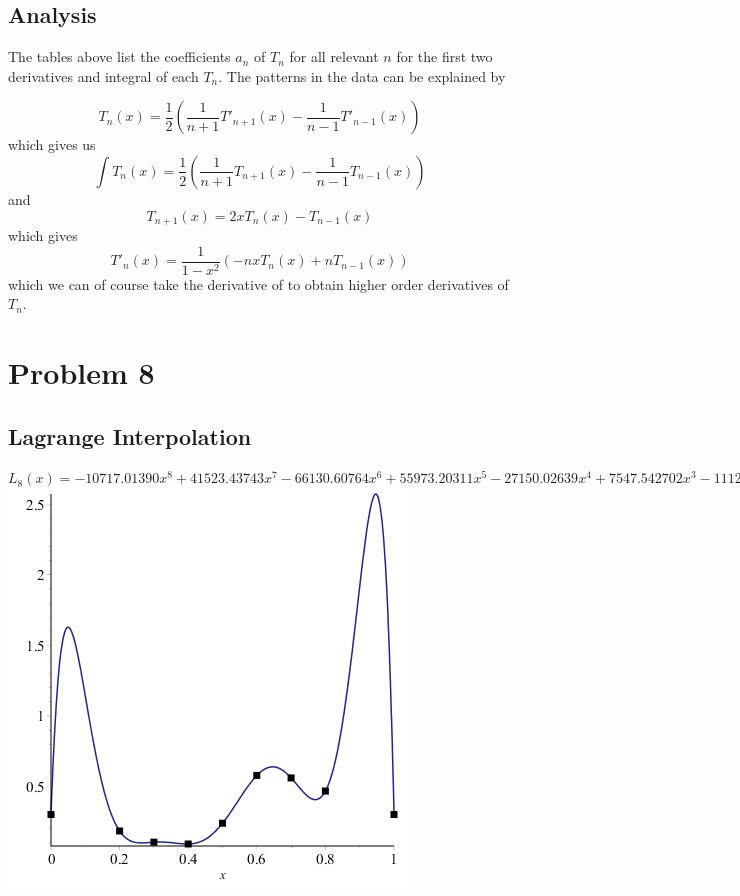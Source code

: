 \documentclass[11pt]{article} %
\begin{document}
\subsection*{Analysis}
The tables above list the coefficients $a_n$ of $T_n$ for all relevant $n$ for the first two derivatives and integral of each $T_n$. The patterns in the data can be explained by

$$T_n(x) = \frac{1}{2} \left( \frac{1}{n+1}T'_{n+1}(x) - \frac{1}{n-1}T'_{n-1}(x) \right)$$
which gives us 
$$\int T_n(x) = \frac{1}{2} \left(  \frac{1}{n+1}T_{n+1}(x) - \frac{1}{n-1}T_{n-1}(x) \right)$$
and
$$T_{n+1}(x) = 2xT_n(x) - T_{n-1}(x)$$
which gives
$$T'_n(x) = \frac{1}{1-x^2} \left( -nxT_n(x) + nT_{n-1}(x) \right)$$
which we can of course take the derivative of to obtain higher order derivatives of $T_n$.
\section*{Problem 8}
\subsection*{Lagrange Interpolation}
$L_8(x) = -10717.01390x^8 + 41523.43743x^7 - 66130.60764x^6 + 55973.20311x^5 - 27150.02639x^4 +7547.542702x^3 - 1112.916584x^2 + 66.38116670x + .302$\\
\includegraphics[scale=.5]{plots/problem7plot1.png}
\end{document}
